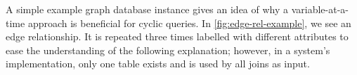 A simple example graph database instance gives an idea of why a variable-at-a-time approach is beneficial for cyclic queries.
In \cref{fig:edge-rel-example}, we see an edge relationship.
It is repeated three times labelled with different attributes to ease the understanding of the following explanation;
however, in a system's implementation, only one table exists and is used by all joins as input.

\begin{figure}
    \centering
    \hspace{0.2\textwidth}
    \hspace{0.2\textwidth}
\end{figure}
